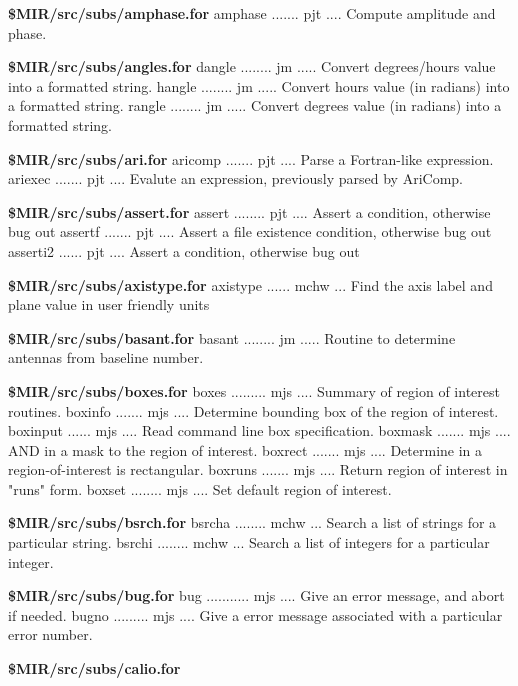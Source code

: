\par{\bf \$MIR/src/subs/amphase.for}
{\eightpoint\begintt
amphase ....... pjt .... Compute amplitude and phase.
\endtt}
\par{\bf \$MIR/src/subs/angles.for}
{\eightpoint\begintt
dangle ........ jm ..... Convert degrees/hours value into a formatted string.
hangle ........ jm ..... Convert hours value (in radians) into a formatted string.
rangle ........ jm ..... Convert degrees value (in radians) into a formatted string.
\endtt}
\par{\bf \$MIR/src/subs/ari.for}
{\eightpoint\begintt
aricomp ....... pjt .... Parse a Fortran-like expression.
ariexec ....... pjt .... Evalute an expression, previously parsed by AriComp.
\endtt}
\par{\bf \$MIR/src/subs/assert.for}
{\eightpoint\begintt
assert ........ pjt .... Assert a condition, otherwise bug out
assertf ....... pjt .... Assert a file existence condition, otherwise bug out
asserti2 ...... pjt .... Assert a condition, otherwise bug out
\endtt}
\par{\bf \$MIR/src/subs/axistype.for}
{\eightpoint\begintt
axistype ...... mchw ... Find the axis label and plane value in user friendly units
\endtt}
\par{\bf \$MIR/src/subs/basant.for}
{\eightpoint\begintt
basant ........ jm ..... Routine to determine antennas from baseline number.
\endtt}
\par{\bf \$MIR/src/subs/boxes.for}
{\eightpoint\begintt
boxes ......... mjs .... Summary of region of interest routines.
boxinfo ....... mjs .... Determine bounding box of the region of interest.
boxinput ...... mjs .... Read command line box specification.
boxmask ....... mjs .... AND in a mask to the region of interest.
boxrect ....... mjs .... Determine in a region-of-interest is rectangular.
\endtt}
{\eightpoint\begintt
boxruns ....... mjs .... Return region of interest in "runs" form.
boxset ........ mjs .... Set default region of interest.
\endtt}
\par{\bf \$MIR/src/subs/bsrch.for}
{\eightpoint\begintt
bsrcha ........ mchw ... Search a list of strings for a particular string.
bsrchi ........ mchw ... Search a list of integers for a particular integer.
\endtt}
\par{\bf \$MIR/src/subs/bug.for}
{\eightpoint\begintt
bug ........... mjs .... Give an error message, and abort if needed.
bugno ......... mjs .... Give a error message associated with a particular error number.
\endtt}
\par{\bf \$MIR/src/subs/calio.for}
